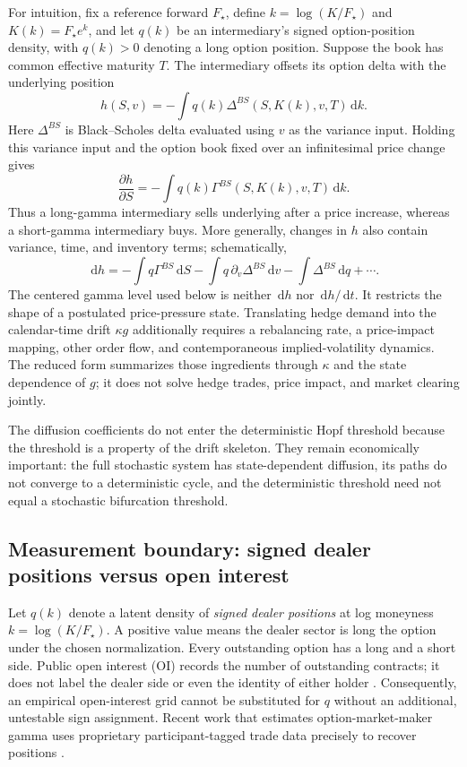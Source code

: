 \documentclass[11pt]{article}
\newcommand{\dd}{\,\mathrm{d}}
\begin{document}
For intuition, fix a reference forward $F_\star$, define
$k=\log(K/F_\star)$ and $K(k)=F_\star e^k$, and let $q(k)$ be an intermediary's signed
option-position density, with $q(k)>0$ denoting a long option position.  Suppose the book has
common effective maturity $T$.  The intermediary offsets its option delta with the underlying
position
\[
h(S,v)=-\int q(k)\Delta^{BS}(S,K(k),v,T)\dd k.
\]
Here $\Delta^{BS}$ is Black--Scholes delta evaluated using $v$ as the variance input.
Holding this variance input and the option book fixed over an infinitesimal price change gives
\[
\frac{\partial h}{\partial S}
=-\int q(k)\Gamma^{BS}(S,K(k),v,T)\dd k.
\]
Thus a long-gamma intermediary sells underlying after a price increase, whereas a
short-gamma intermediary buys.  More generally, changes in $h$ also contain variance, time,
and inventory terms; schematically,
\[
\dd h=-\int q\Gamma^{BS}\dd S-\int q\,\partial_v\Delta^{BS}\dd v
      -\int \Delta^{BS}\dd q+\cdots.
\]
The centered gamma level used below is neither $\dd h$ nor $\dd h/\dd t$.  It restricts the
shape of a postulated price-pressure state.  Translating hedge demand into the calendar-time
drift $\kappa g$ additionally requires a rebalancing rate, a price-impact mapping, other
order flow, and contemporaneous implied-volatility dynamics.  The reduced form summarizes
those ingredients through $\kappa$ and the state dependence of $g$; it does not solve hedge
trades, price impact, and market clearing jointly.

The diffusion coefficients do not enter the deterministic Hopf threshold because the
threshold is a property of the drift skeleton.  They remain economically important: the
full stochastic system has state-dependent diffusion, its paths do not converge to a
deterministic cycle, and the deterministic threshold need not equal a stochastic
bifurcation threshold.

\subsection{Measurement boundary: signed dealer positions versus open interest}
\label{sec:measurement}

Let $q(k)$ denote a latent density of \emph{signed dealer positions} at log moneyness
$k=\log(K/F_\star)$.  A positive value means the dealer sector is long the option under the
chosen normalization.  Every outstanding option has a long and a short side.  Public open
interest (OI) records the number of outstanding contracts; it does not label the dealer side or
even the identity of either holder \citep{oicopeninterest}.  Consequently, an empirical
open-interest grid cannot be substituted for $q$ without an additional, untestable sign
assignment.  Recent work that estimates option-market-maker gamma uses proprietary
participant-tagged trade data precisely to recover positions \citep{vasquez2025zerodte}.
\end{document}

